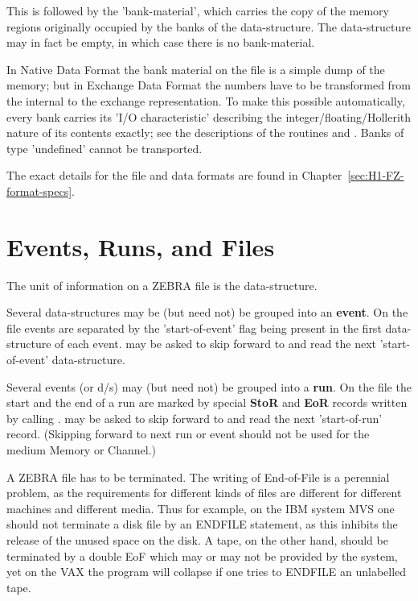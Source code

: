This is followed by the 'bank-material',
which carries the copy of the memory regions originally occupied
by the banks of the data-structure.
The data-structure may in fact be empty,
in which case there is no bank-material.

In Native Data Format the bank material on the file
is a simple dump of the memory;
but in Exchange Data Format the numbers have to be transformed
from the internal to the exchange representation.
To make this possible automatically,
every bank carries its 'I/O characteristic' describing
the integer/floating/Hollerith nature of its contents exactly;
see the descriptions of the routines 
and .
Banks of type 'undefined' cannot be transported.

The exact details for the file and data formats
are found in Chapter~\ref{sec:H1-FZ-format-specs}.

\section{Events, Runs, and Files}
\label{sec:events-runs-files}

The unit of information on a ZEBRA file is the data-structure.

Several data-structures may be (but need not)
be grouped into an \textbf{event}.
On the file events are separated by the 'start-of-event'
flag being present in the first data-structure of each event.
 may be asked to skip forward to and read the next
'start-of-event' data-structure.

Several events (or d/s) may (but need not) be grouped into a
\textbf{run}.
On the file the start and the end of a run are marked by
special \textbf{StoR} and \textbf{EoR} records written by calling .
 may be asked to skip forward to and read the next
'start-of-run' record.
(Skipping forward to next run or event should not be used
for the medium Memory or Channel.)

A ZEBRA file has to be terminated.
The writing of End-of-File is a perennial problem,
as the requirements for different kinds of files are
different for different machines and different media.
Thus for example, on the IBM system MVS one should not terminate
a disk file by an ENDFILE statement,
as this inhibits the release of the unused space on the disk.
A tape, on the other hand,
should be terminated by a double EoF which may or may not be
provided by the system, yet on the VAX the program will collapse
if one tries to ENDFILE an unlabelled tape.

